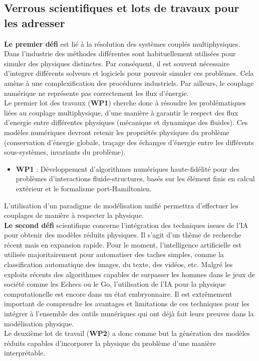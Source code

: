 \documentclass[12pt, french]{article}
\begin{document}
\subsection{Verrous scientifiques et lots de travaux pour les adresser}
\textbf{Le premier défi} est lié \`a la résolution des systèmes couplés multiphysiques.  Dans l'industrie des méthodes différentes sont habituellement utilisées pour simuler des physiques distinctes. Par conséquent, il est souvent nécessaire d'integrer différents solveurs et logiciels pour pouvoir simuler ces problèmes. Cela amène \`a une complexification des procédures industriels. Par ailleurs, le couplage numérique ne représente pas correctement les flux d’énergie. \\
Le premier lot des travaux (\textbf{WP1}) cherche donc à résoudre les problématiques liées au couplage multiphysique, d'une manière \`a garantir le respect des flux d'energie entre différentes physiques (mécanique et dynamique des fluides).
\newline\newline
 Ces modèles numériques devront retenir les propriétés physiques du problème (conservation d’énergie globale, traçage des échanges d’énergie entre les différents sous-systèmes, invariants du problème). \\

\begin{itemize}
	\item \textbf{WP1} : Développement d'algorithmes numériques haute-fidélité pour des problèmes d'interactions fluide-structures, basés sur les élément finis en calcul extérieur et le formalisme port-Hamiltonien. \\
\end{itemize}

L’utilisation d’un paradigme de modélisation unifié permettra d’effectuer les couplages de manière à respecter la physique.\\

\textbf{Le second défi} scientifique concerne l'intégration des techniques issues de l'IA pour obtenir des modèles réduits physiques. Il s'agit d'un thème de recherche récent mais en expansion rapide. Pour le moment, l'intelligence artificielle est utilisée majoritairement pour automatiser des taches simples, comme la classification automatique des images, du texte, des vidéos, etc. Malgré les exploits récents des algorithmes capables de surpasser les hommes dans le jeux de société comme les Echecs ou le Go, l'utilisation de l'IA pour la physique computationelle est encore dans un état embryonnaire. Il est extrêmement important de comprendre les avantages et limitations de ces techniques pour les intégrer à l'ensemble des outils numériques qui ont déjà fait leurs preuves dans la modélisation physique. \\
Le deuxième lot de travail (\textbf{WP2}) a donc comme but la génération des modèles réduits capables d'incorporer la physique du problème d'une manière interprétable. \\
\end{document}
